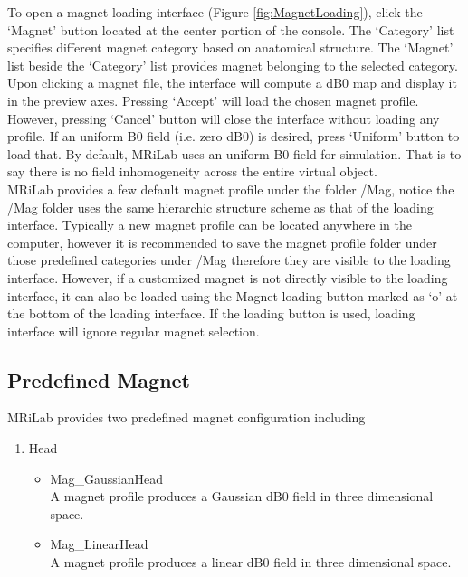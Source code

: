 \documentclass{book}%
\begin{document}
To open a magnet loading interface (Figure \ref{fig:MagnetLoading}), click the `Magnet' button located at the center portion of the console. The `Category' list specifies different magnet category based on anatomical structure. The `Magnet' list beside the `Category' list provides magnet belonging to the selected category. Upon clicking a magnet file, the interface will compute a dB0 map and display it in the preview axes. Pressing `Accept' will load the chosen magnet profile. However, pressing `Cancel' button will close the interface without loading any profile. If an uniform B0 field (i.e. zero dB0) is desired, press `Uniform' button to load that. By default, MRiLab uses an uniform B0 field for simulation. That is to say there is no field inhomogeneity across the entire virtual object. \\

MRiLab provides a few default magnet profile under the folder /Mag, notice the /Mag folder uses the same hierarchic structure scheme as that of the loading interface. Typically a new magnet profile can be located anywhere in the computer, however it is recommended to save the magnet profile folder under those predefined categories under /Mag therefore they are visible to the loading interface. However, if a customized magnet is not directly visible to the loading interface, it can also be loaded using the Magnet loading button marked as `o' at the bottom of the loading interface. If the loading button is used, loading interface will ignore regular magnet selection.

\subsection{Predefined Magnet}

MRiLab provides two predefined magnet configuration including

\begin{enumerate}
		\item Head
		\begin{itemize}
			\item Mag\_GaussianHead \\
			A magnet profile produces a Gaussian dB0 field in three dimensional space.
			\item Mag\_LinearHead \\
			A magnet profile produces a linear dB0 field in three dimensional space.
		\end{itemize}

\end{enumerate}
\end{document}
